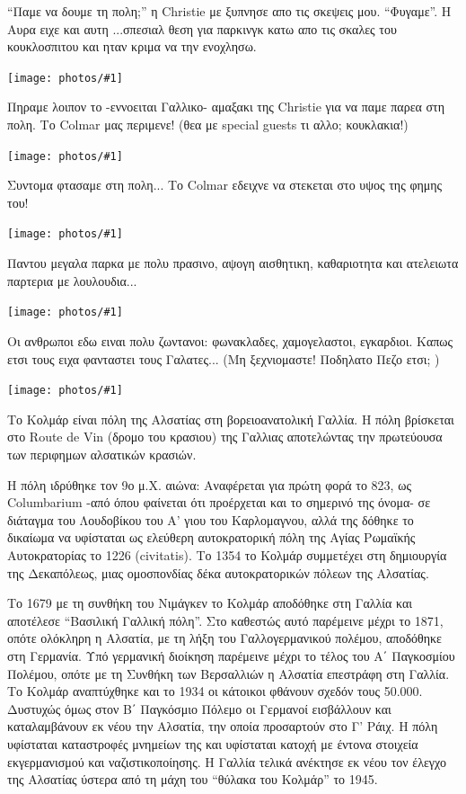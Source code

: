\documentclass[11pt, letterpaper]{book}
\newcommand\photo[1]{\begin{center}\noindent\texttt{[image: photos/\#1]}\end{center}}
\begin{document}
``Παμε να δουμε τη πολη;'' η Christie με ξυπνησε απο τις σκεψεις μου. ``Φυγαμε''.
Η Αυρα ειχε και αυτη ...σπεσιαλ θεση για παρκινγκ κατω απο τις σκαλες του κουκλοσπιτου και ηταν κριμα να την ενοχλησω.

\photo{88.jpg}

Πηραμε λοιπον το -εννοειται Γαλλικο- αμαξακι της Christie για να παμε παρεα στη πολη.
Το Colmar μας περιμενε! (θεα με special guests τι αλλο; κουκλακια!)  

\photo{89.jpg}

Συντομα φτασαμε στη πολη... Το Colmar εδειχνε να στεκεται στο υψος της φημης του!

\photo{90.jpg}

Παντου μεγαλα παρκα με πολυ πρασινο, αψογη αισθητικη, καθαριοτητα και ατελειωτα παρτερια με λουλουδια...

\photo{91.jpg}

Οι ανθρωποι εδω ειναι πολυ ζωντανοι: φωνακλαδες, χαμογελαστοι, εγκαρδιοι. Καπως ετσι τους ειχα φανταστει τους Γαλατες...
(Μη ξεχνιομαστε! Ποδηλατο Πεζο ετσι; )

\photo{92.jpg}

Το Κολμάρ είναι πόλη της Αλσατίας στη βορειοανατολική Γαλλία. Η πόλη βρίσκεται στο Route de Vin (δρομο του κρασιου) της Γαλλιας αποτελώντας την πρωτεύουσα των περιφημων αλσατικών κρασιών.

Η πόλη ιδρύθηκε τον 9ο μ.Χ. αιώνα: Αναφέρεται για πρώτη φορά το 823, ως Columbarium -από όπου φαίνεται ότι προέρχεται και το σημερινό της όνομα- σε διάταγμα του Λουδοβίκου του Α' γιου του Καρλομαγνου, αλλά της δόθηκε το δικαίωμα να υφίσταται ως ελεύθερη αυτοκρατορική πόλη της Αγίας Ρωμαϊκής Αυτοκρατορίας το 1226 (civitatis). Το 1354 το Κολμάρ συμμετέχει στη δημιουργία της Δεκαπόλεως, μιας ομοσπονδίας δέκα αυτοκρατορικών πόλεων της Αλσατίας.

Το 1679 με τη συνθήκη του Νιμάγκεν το Κολμάρ αποδόθηκε στη Γαλλία και αποτέλεσε ``Βασιλική Γαλλική πόλη''. Στο καθεστώς αυτό παρέμεινε μέχρι το 1871, οπότε ολόκληρη η Αλσατία, με τη λήξη του Γαλλογερμανικού πολέμου, αποδόθηκε στη Γερμανία. Υπό γερμανική διοίκηση παρέμεινε μέχρι το τέλος του Α΄ Παγκοσμίου Πολέμου, οπότε με τη Συνθήκη των Βερσαλλιών η Αλσατία επεστράφη στη Γαλλία. Το Κολμάρ αναπτύχθηκε και το 1934 οι κάτοικοι φθάνουν σχεδόν τους 50.000.
Δυστυχώς όμως στον Β΄ Παγκόσμιο Πόλεμο οι Γερμανοί εισβάλλουν και καταλαμβάνουν εκ νέου την Αλσατία, την οποία προσαρτούν στο Γ' Ράιχ. Η πόλη υφίσταται καταστροφές μνημείων της και υφίσταται κατοχή με έντονα στοιχεία εκγερμανισμού και ναζιστικοποίησης. Η Γαλλία τελικά ανέκτησε εκ νέου τον έλεγχο της Αλσατίας ύστερα από τη μάχη του ``θύλακα του Κολμάρ'' το 1945.
\end{document}
